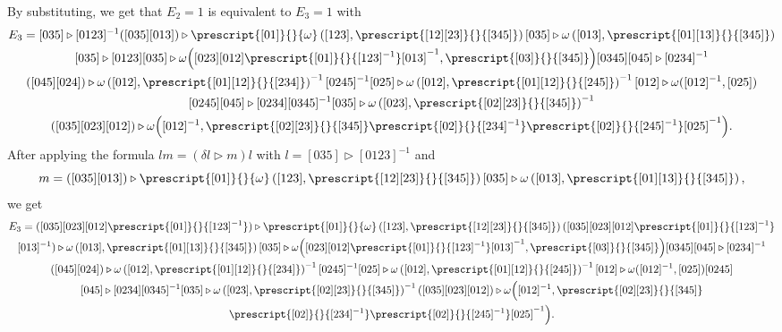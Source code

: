 \documentclass[a4paper, oneside]{amsart}
\numberwithin{equation}{subsection}
\theoremstyle{referencedlemma}
\theoremstyle{plain} %
\theoremstyle{remark}
\begin{document}
By substituting, we get that $E_2 = 1$ is equivalent to $E_3 = 1$ with 
\begin{multline*}
E_3 = [035]\triangleright [0123]^{-1} ([035][013]) \triangleright \prescript{[01]}{}{\omega} \left([123], \prescript{[12][23]}{}{[345]} \right) [035]\triangleright \omega\left([013], \prescript{[01][13]}{}{[345]} \right)\\
[035]\triangleright [0123] [035]\triangleright \omega\Big ( [023][012]\prescript{[01]}{}{[123]^{-1}}[013]^{-1}, \prescript{[03]}{}{[345]}  \Big )[0345][045]\triangleright [0234]^{-1} \\
  ([045][024]) \triangleright \omega \left( [012], \prescript{[01][12]}{}{[234]} \right)^{-1} [0245]^{-1}[025]\triangleright \omega\left([012], \prescript{[01][12]}{}{[245]} \right)^{-1} [012] \triangleright \omega ([012]^{-1}, [025]) \\
 [0245][045]\triangleright [0234][0345]^{-1}  [035] \triangleright \omega\left([023], \prescript{[02][23]}{}{[345]} \right)^{-1} \\
 ([035][023][012])\triangleright \omega \Big ([012]^{-1},  \prescript{[02][23]}{}{[345]}\prescript{[02]}{}{[234]^{-1}} \prescript{[02]}{}{[245]^{-1}} [025]^{-1} \Big ).
\end{multline*}
After applying the formula $lm = (\delta l \triangleright m)l$ with $l = [035]\triangleright [0123]^{-1}$ and 
\begin{equation*}
m = ([035][013]) \triangleright \prescript{[01]}{}{\omega} \left([123], \prescript{[12][23]}{}{[345]} \right) [035]\triangleright \omega\left([013], \prescript{[01][13]}{}{[345]} \right),
\end{equation*}
we get 
\begin{multline*}
E_3 = ([035][023][012]\prescript{[01]}{}{[123]^{-1}}) \triangleright \prescript{[01]}{}{\omega} \left([123], \prescript{[12][23]}{}{[345]} \right) ([035][023][012]\prescript{[01]}{}{[123]^{-1}}\\
[013]^{-1})\triangleright \omega\left([013], \prescript{[01][13]}{}{[345]} \right) [035]\triangleright \omega\Big ( [023][012]\prescript{[01]}{}{[123]^{-1}}[013]^{-1}, \prescript{[03]}{}{[345]}  \Big )[0345][045]\triangleright [0234]^{-1} \\
([045][024]) \triangleright \omega \left( [012], \prescript{[01][12]}{}{[234]} \right)^{-1}
  [0245]^{-1}[025]\triangleright \omega\left([012], \prescript{[01][12]}{}{[245]} \right)^{-1} [012] \triangleright \omega ([012]^{-1}, [025]) [0245]\\
  [045]\triangleright [0234][0345]^{-1}
  [035] \triangleright \omega\left([023], \prescript{[02][23]}{}{[345]} \right)^{-1} ([035][023][012])\triangleright \omega \Big ([012]^{-1},  \prescript{[02][23]}{}{[345]}\\
  \prescript{[02]}{}{[234]^{-1}} \prescript{[02]}{}{[245]^{-1}} [025]^{-1} \Big ).
\end{multline*}
\end{document}
